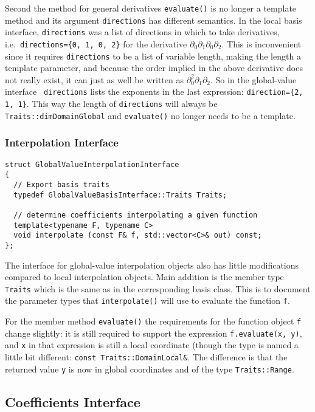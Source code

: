 \documentclass[a4paper,11pt]{article}
\begin{document}
Second the method for general derivatives {\tt evaluate()} is no longer a
template method and its argument {\tt directions} has different semantics.  In
the local basis interface, {\tt directions} was a list of directions in which
to take derivatives, i.e.\ {\tt directions=\{0, 1, 0, 2\}} for the derivative
$\partial_0\partial_1\partial_0\partial_2$.  This is inconvenient since it
requires {\tt directions} to be a list of variable length, making the length a
template parameter, and because the order implied in the above derivative does
not really exist, it can just as well be written as
$\partial_0^2\partial_1\partial_2$.  So in the global-value interface {\tt
  directions} lists the exponents in the last expression: {\tt direction=\{2,
  1, 1\}}.  This way the length of {\tt directions} will always be {\tt
  Traits::dimDomainGlobal} and {\tt evaluate()} no longer needs to be a
template.

\subsubsection{Interpolation Interface}

\begin{lstlisting}
struct GlobalValueInterpolationInterface
{
  // Export basis traits
  typedef GlobalValueBasisInterface::Traits Traits;

  // determine coefficients interpolating a given function
  template<typename F, typename C>
  void interpolate (const F& f, std::vector<C>& out) const;
};
\end{lstlisting}
The interface for global-value interpolation objects also has little
modifications compared to local interpolation objects.  Main addition is the
member type {\tt Traits} which is the same as in the corresponding basis
class.  This is to document the parameter types that {\tt interpolate()} will
use to evaluate the function {\tt f}.

For the member method {\tt evaluate()} the requirements for the function
object {\tt f} change slightly: it is still required to support the expression
{\tt f.evaluate(x, y)}, and {\tt x} in that expression is still a local
coordinate (though the type is named a little bit different: {\tt const
  Traits::DomainLocal\&}.  The difference is that the returned value {\tt y}
is now in global coordinates and of the type {\tt Traits::Range}.

\subsection{Coefficients Interface}
\end{document}
